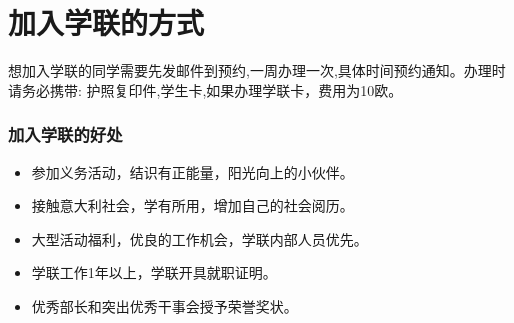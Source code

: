 \documentclass[3pt,a5paper,openright,twoside]{book}
\begin{document}
\section{加入学联的方式}
想加入学联的同学需要先发邮件到预约,一周办理一次,具体时间预约通知。办理时请务必携带: 护照复印件,学生卡,如果办理学联卡，费用为10欧。

\subsubsection*{加入学联的好处}
\begin{itemize}
\item 参加义务活动，结识有正能量，阳光向上的小伙伴。
\item 接触意大利社会，学有所用，增加自己的社会阅历。
\item 大型活动福利，优良的工作机会，学联内部人员优先。
\item 学联工作1年以上，学联开具就职证明。
\item 优秀部长和突出优秀干事会授予荣誉奖状。
\end{itemize}


% 
%
%
%



\renewcommand{\chaptermark}[1]{\markright{\thechapter \ #1}{}}
\lhead[\fancyplain{}{\bfseries\thepage}]{\fancyplain{}{\bfseries\rightmark}}



% 
%
%
%


 


% 
%
%
%


%  


% 
%
%
%

%  
% 
% 
%
%
%
\end{document}
